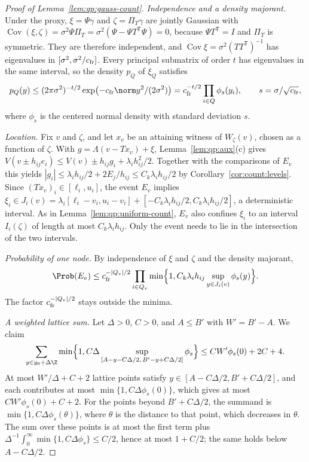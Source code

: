 \begin{proof}[Proof of Lemma~\ref{lem:qp:gauss-count}]
\emph{Independence and a density majorant.} Under the proxy, $\xi=\Psi\gamma$
and $\zeta=\Pi_T\gamma$ are jointly Gaussian with
$\operatorname{Cov}(\xi,\zeta)=\sigma^2\Psi\Pi_T=\sigma^2(\Psi-\Psi T^{\mathsf T}\Psi)=0$,
because $\Psi T^{\mathsf T}=I$ and $\Pi_T$ is symmetric. They are therefore
independent, and
$\operatorname{Cov}\xi=\sigma^2(TT^{\mathsf T})^{-1}$ has eigenvalues in
$[\sigma^2,\sigma^2/c_{\rm fr}]$. Every principal submatrix of order $t$ has
eigenvalues in the same interval, so the density $p_Q$ of $\xi_Q$ satisfies
\[
 p_Q(y)\le(2\pi\sigma^2)^{-t/2}\exp\bigl(-c_{\rm fr}\norm y^2/(2\sigma^2)\bigr)
 =c_{\rm fr}^{-t/2}\prod_{i\in Q}\phi_s(y_i),
 \qquad s=\sigma/\sqrt{c_{\rm fr}},
\]
where $\phi_s$ is the centered normal density with standard deviation $s$.

\emph{Location.} Fix $v$ and $\zeta$, and let $x_v$ be an attaining witness of
$W_\zeta(v)$, chosen as a function of $\zeta$. With
$g=\Lambda(v-Tx_v)+\xi$, Lemma~\ref{lem:qp:aux}(c) gives
$V(v\pm h_{ij}e_i)\le V(v)\pm h_{ij}g_i+\lambda_ih_{ij}^2/2$. Together with the
comparisons of $E_v$ this yields $|g_i|\le\lambda_ih_{ij}/2+2E_j/h_{ij}\le C_k\lambda_ih_{ij}/2$
by Corollary~\ref{cor:count:levels}. Since $(Tx_v)_i\in[\ell_i,u_i]$, the event
$E_v$ implies $\xi_i\in J_i(v)=\lambda_i[\ell_i-v_i,u_i-v_i]+[-C_k\lambda_ih_{ij}/2,C_k\lambda_ih_{ij}/2]$,
a deterministic interval. As in Lemma~\ref{lem:qp:uniform-count}, $E_v$ also
confines $\xi_i$ to an interval $I_i(\zeta)$ of length at most
$C_k\lambda_ih_{ij}$. Only the event needs to lie in the intersection of the
two intervals.

\emph{Probability of one node.} By independence of $\xi$ and $\zeta$ and the
density majorant,
\[
 \Prob(E_v)\le c_{\rm fr}^{-|Q_v|/2}\prod_{i\in Q_v}
 \min\Bigl\{1,C_k\lambda_ih_{ij}\sup_{y\in J_i(v)}\phi_s(y)\Bigr\}.
\]
The factor $c_{\rm fr}^{-|Q_v|/2}$ stays outside the minima.

\emph{A weighted lattice sum.} Let $\Delta>0$, $C>0$, and $A\le B'$ with
$W'=B'-A$. We claim
\[
 \sum_{y\in y_0+\Delta\Z}\min\Bigl\{1,C\Delta\sup_{[A-y-C\Delta/2,\,B'-y+C\Delta/2]}\phi_s\Bigr\}
 \le CW'\phi_s(0)+2C+4 .
\]
At most $W'/\Delta+C+2$ lattice points satisfy
$y\in[A-C\Delta/2,B'+C\Delta/2]$, and each contributes at most
$\min\{1,C\Delta\phi_s(0)\}$, which gives at most $CW'\phi_s(0)+C+2$. For the
points beyond $B'+C\Delta/2$, the summand is
$\min\{1,C\Delta\phi_s(\theta)\}$, where $\theta$ is the distance to that
point, which decreases in $\theta$. The sum over these points is at most the
first term plus $\Delta^{-1}\int_0^\infty\min\{1,C\Delta\phi_s\}\le C/2$, hence
at most $1+C/2$; the same holds below $A-C\Delta/2$.


\end{proof}
